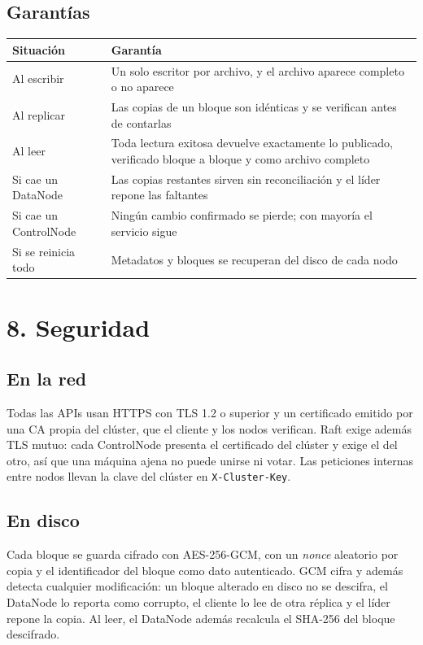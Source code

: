 \documentclass[10pt]{article}
\begin{document}
\subsection{Garantías}

\begin{xltabular}{\linewidth}{@{}L{4.4cm}Y@{}}
\toprule
Situación & Garantía \\
\midrule\endhead
Al escribir & Un solo escritor por archivo, y el archivo aparece completo o no aparece \\
Al replicar & Las copias de un bloque son idénticas y se verifican antes de contarlas \\
Al leer & Toda lectura exitosa devuelve exactamente lo publicado, verificado bloque a bloque y como archivo completo \\
Si cae un DataNode & Las copias restantes sirven sin reconciliación y el líder repone las faltantes \\
Si cae un ControlNode & Ningún cambio confirmado se pierde; con mayoría el servicio sigue \\
Si se reinicia todo & Metadatos y bloques se recuperan del disco de cada nodo \\
\bottomrule
\end{xltabular}

\separador

\section{8. Seguridad}

\subsection{En la red}

Todas las APIs usan HTTPS con TLS 1.2 o superior y un certificado emitido por una CA propia del clúster, que el cliente y los nodos verifican. Raft exige además TLS mutuo: cada ControlNode presenta el certificado del clúster y exige el del otro, así que una máquina ajena no puede unirse ni votar. Las peticiones internas entre nodos llevan la clave del clúster en \texttt{X-Cluster-Key}.

\subsection{En disco}

Cada bloque se guarda cifrado con AES-256-GCM, con un \emph{nonce} aleatorio por copia y el identificador del bloque como dato autenticado. GCM cifra y además detecta cualquier modificación: un bloque alterado en disco no se descifra, el DataNode lo reporta como corrupto, el cliente lo lee de otra réplica y el líder repone la copia. Al leer, el DataNode además recalcula el SHA-256 del bloque descifrado.
\end{document}
